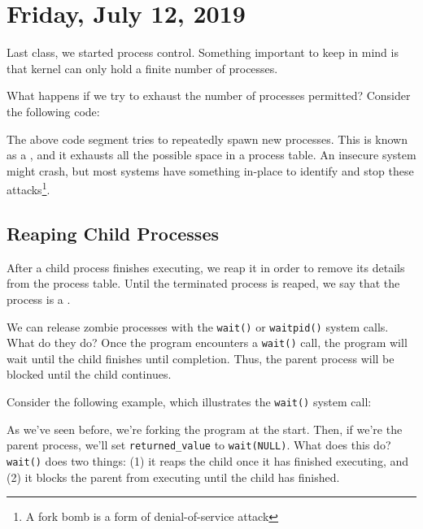 \section{Friday, July 12, 2019}

Last class, we started process control. Something important to keep in mind is that kernel can only hold a finite number of processes.

What happens if we try to exhaust the number of processes permitted? Consider the following code:

\lstset{
caption=Fork Bomb
}
\begin{center}

\end{center}

The above code segment tries to repeatedly spawn new processes. This is known as a , and it exhausts all the possible space in a process table. An insecure system might crash, but most systems have something in-place to identify and stop these attacks\footnote{A fork bomb is a form of denial-of-service attack}.


\subsection{Reaping Child Processes}
After a child process finishes executing, we reap it in order to remove its details from the process table. Until the terminated process is reaped, we say that the process is a . 

We can release zombie processes with the \verb!wait()! or \verb!waitpid()! system calls. What do they do? Once the program encounters a \verb!wait()! call, the program will wait until the child finishes until completion. Thus, the parent process will be blocked until the child continues. 


Consider the following example, which illustrates the \verb!wait()! system call:

\lstset{
caption=Wait Example
}
\begin{center}

\end{center}

As we've seen before, we're forking the program at the start. Then, if we're the parent process, we'll set \verb!returned_value! to \verb!wait(NULL)!. What does this do? \verb!wait()! does two things: (1) it reaps the child once it has finished executing, and (2) it blocks the parent from executing until the child has finished. 


